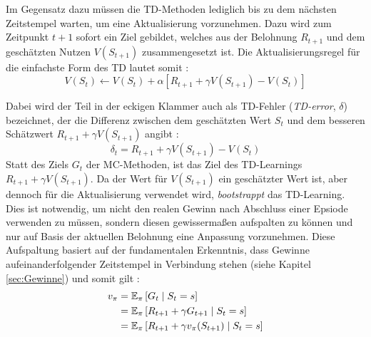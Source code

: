 Im Gegensatz dazu müssen die TD-Methoden lediglich bis zu dem nächsten Zeitstempel warten, um eine Aktualisierung vorzunehmen. Dazu wird zum Zeitpunkt $t+1$ sofort ein Ziel gebildet, welches aus der Belohnung $R_{t+1}$ und dem geschätzten Nutzen $V(S_{t+1})$ zusammengesetzt ist. Die Aktualisierungsregel für die einfachste Form des TD lautet somit \cite[S.~120]{Sutton1998}:
\begin{equation}\label{eq:tdupdate}
    V(S_t) \gets V(S_t) + \alpha \left[R_{t+1} + \gamma V(S_{t+1}) - V(S_t)\right]
\end{equation}
\par 
Dabei wird der Teil in der eckigen Klammer auch als TD-Fehler (\textit{TD-error}, $\delta$) bezeichnet, der die Differenz zwischen dem geschätzten Wert $S_t$ und dem besseren Schätzwert $R_{t+1} + \gamma V(S_{t+1})$ angibt \cite[S.~121]{Sutton1998}:
\begin{equation}\label{eq:tderror}
    \delta_t = R_{t+1} + \gamma V(S_{t+1}) - V(S_t)
\end{equation}
Statt des Ziels $G_t$ der MC-Methoden, ist das Ziel des TD-Learnings $R_{t+1} + \gamma V(S_{t+1})$. Da der Wert für $V(S_{t+1})$ ein geschätzter Wert ist, aber dennoch für die Aktualisierung verwendet wird, \textit{bootstrappt} das TD-Learning. Dies ist notwendig, um nicht den realen Gewinn nach Abschluss einer Epsiode verwenden zu müssen, sondern diesen gewissermaßen aufspalten zu können und nur auf Basis der aktuellen Belohnung eine Anpassung vorzunehmen. 
\newpage 
Diese Aufspaltung basiert auf der fundamentalen Erkenntnis, dass Gewinne aufeinanderfolgender Zeitstempel in Verbindung stehen (siehe Kapitel \ref{sec:Gewinne}) und somit gilt \cite[S.~120]{Sutton1998}: 
\begin{equation}\label{eq:targets}
\begin{aligned}
v_\pi &= \operatorname{\mathbb{E}}_\pi\left[G_t \mid S_t = s \right] \\
&= \operatorname{\mathbb{E}}_\pi\left[R_{t+1} + \gamma G_{t+1} \mid S_t = s \right] \\
        &= \operatorname{\mathbb{E}}_\pi\left[R_{t+1} + \gamma v_\pi(S_{t+1}) \mid S_t = s \right]
\end{aligned}
\end{equation}


